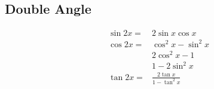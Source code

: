 \documentclass[10pt]{article}
\begin{document}
\begin{multicols}{2}
  \subsection*{Double Angle}
  \begin{align*}
     & \sin 2x = & 2\sin x \cos x                \\
     & \cos 2x = & \cos^{2}x - \sin^{2}x         \\
     &           & 2\cos^{2}x - 1                \\
     &           & 1 - 2\sin^{2}x                \\
     & \tan 2x = & \frac{2\tan x}{1 - \tan^{2}x}
  \end{align*}
\end{multicols}

\newpage
\end{document}
